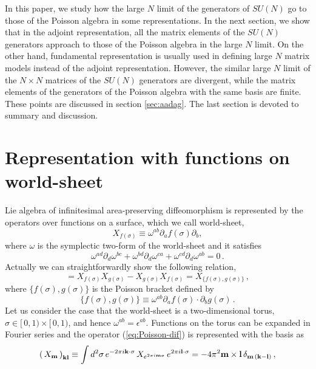 \documentclass[a4paper,12pt]{article}
\begin{document}
In this paper, we study how the large $N$ limit of the generators of
$SU(N)$ go to those of the Poisson algebra in some representations.
In the next section, we show that in the adjoint representation, all
the matrix elements of the $SU(N)$ generators approach to those of the
Poisson algebra in the large $N$ limit.
On the other hand, fundamental representation is usually used in
defining large $N$ matrix models instead of the adjoint
representation.
However, the similar large $N$ limit of the $N\times N$ matrices
of the $SU(N)$ generators are divergent, while the matrix elements of
the generators of the Poisson algebra with the same basis are finite.
These points are discussed in section \ref{sec:aadag}.
The last section is devoted to summary and discussion.

\section{Representation with functions on world-sheet}
Lie algebra of infinitesimal area-preserving diffeomorphism is
represented by the operators over functions on a surface, which we
call world-sheet,
\begin{equation}
 X_{f(\sigma)}\equiv\omega^{ab}\partial_af(\sigma)\partial_b,
	\label{eq:Poisson-dif}
\end{equation}
where $\omega$ is the symplectic two-form of the world-sheet
and it satisfies
\begin{equation}
  \omega^{ad}\partial_d\omega^{bc} +
  \omega^{bd}\partial_d\omega^{ca} +
  \omega^{cd}\partial_d\omega^{ab} =0\,.
\end{equation}
Actually we can straightforwardly show the following relation,
\begin{equation}
 [X_{f(\sigma)},X_{g(\sigma)}]
  =X_{f(\sigma)}X_{g(\sigma)}-X_{g(\sigma)}X_{f(\sigma)}
  =X_{\{f(\sigma),g(\sigma)\}}\,, \label{eq:ComX}
\end{equation}
where $\{f(\sigma),g(\sigma)\}$ is the Poisson bracket defined by
\begin{equation}
 \{f(\sigma),g(\sigma)\} \equiv
	\omega^{ab}\partial_a f(\sigma) \cdot \partial_b g(\sigma)\,.
\end{equation}
Let us consider the case that the world-sheet is a two-dimensional
torus, $\sigma\in [\,0,1)\times [\,0,1)$, and hence
$\omega^{ab}=\epsilon^{ab}$.
Functions on the torus can be expanded in Fourier series and the
operator (\ref{eq:Poisson-dif}) is represented with the basis as
\begin{equation}
  \left(\,X_{\bf m}\,\right)_{\bf kl} \equiv \int d^2\sigma\,
   e^{-2\pi i {\bf k}\cdot \sigma}\, X_{e^{2\pi i {\bf m}\sigma}}\,
   e^{2\pi i {\bf l}\cdot\sigma}= -4\pi^2 {\bf m}\times{\bf l}\,
   \delta_{{\bf m}\,({\bf k-l})}\,,\label{eq:Padj}
\end{equation}
\end{document}
